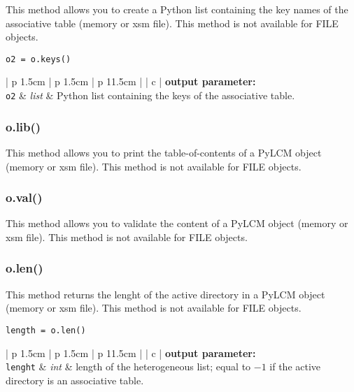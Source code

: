 This method allows you to create a Python list containing the key names of the associative table
(memory or {\sc xsm} file). This method is not available for FILE objects.

\begin{verbatim}
o2 = o.keys()
\end{verbatim}

\noindent
\begin{tabular} {| p {1.5cm} | p {1.5cm} | p {11.5cm} |}
\hline
{} {| c |} {\bf output parameter:} \\
\hline
{\tt o2} & {\it list} & Python list containing the keys of the associative table. \\
\hline
\end{tabular}

\vskip 0.4cm

\subsubsection{o.lib()}

This method allows you to print the table-of-contents of a PyLCM object  (memory or {\sc xsm} file). This method is not available for
FILE objects.

\vskip 0.4cm

\subsubsection{o.val()}

This method allows you to validate the content of a PyLCM object (memory or {\sc xsm} file). This method is not available for
FILE objects.

\vskip 0.4cm

\subsubsection{o.len()}

This method returns the lenght of the active directory in a PyLCM object (memory or {\sc xsm} file). This method is not available for FILE objects.

\begin{verbatim}
length = o.len()
\end{verbatim}

\noindent
\begin{tabular} {| p {1.5cm} | p {1.5cm} | p {11.5cm} |}
\hline
{} {| c |} {\bf output parameter:} \\
\hline
{\tt lenght} & {\it int} & length of the heterogeneous list; equal to $-1$ if the active directory is an associative table. \\
\hline
\end{tabular}

